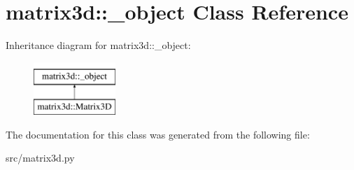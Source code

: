 \hypertarget{classmatrix3d_1_1__object}{
\section{matrix3d::\_\-object Class Reference}
\label{d7/d99/classmatrix3d_1_1__object}
}
Inheritance diagram for matrix3d::\_\-object:\begin{figure}[H]
\begin{center}
\leavevmode
\includegraphics[height=2cm]{d7/d99/classmatrix3d_1_1__object}
\end{center}
\end{figure}


The documentation for this class was generated from the following file:\begin{DoxyCompactItemize}
\item 
src/matrix3d.py\end{DoxyCompactItemize}
